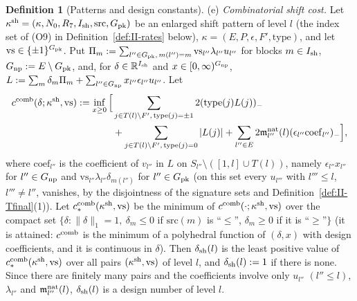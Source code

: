 \documentclass[10pt]{amsart}
\theoremstyle{definition}
\newtheorem{definition}[theorem]{Definition}
\theoremstyle{remark}
\newcommand{\R}{\mathbb R}
\begin{document}
\begin{definition}[Patterns and design constants]
\textup{(e)} \emph{Combinatorial shift cost.}  Let $\kappa^{\rm sh}=(\kappa,
N_0,R_7,I_{\rm sh},\mathrm{src},G_{\rm pk})$ be an enlarged shift pattern of
level $l$ (the index set of (O9) in Definition~\ref{def:II-rates} below),
$\kappa=(E,P,\epsilon,F',\mathrm{type})$, and let $\mathrm{vs}\in\{\pm1\}^{
G_{\rm pk}}$.  Put $\Pi_m:=\sum_{l''\in G_{\rm pk},\,m(l'')=m}\mathrm{vs}_{l''}
\lambda_{l''}u_{l''}$ for blocks $m\in I_{\rm sh}$, $G_{\rm np}:=E\setminus
G_{\rm pk}$, and, for $\delta\in\R^{I_{\rm sh}}$ and $x\in[0,\infty)^{G_{\rm
np}}$, $L:=\sum_m\delta_m\Pi_m+\sum_{l''\in G_{\rm np}}x_{l''}\epsilon_{l''}
u_{l''}$.  Let
\[
 \begin{split}
 c^{\rm comb}(\delta;\kappa^{\rm sh},\mathrm{vs}):=\inf_{x\ge0}\Big[&\sum_{j\in
 T(l)\setminus F',\,\mathrm{type}(j)=\pm1}2(\mathrm{type}(j)L(j))_-\\
 &+\sum_{j\in T(l)\setminus F',\,\mathrm{type}(j)=0}|L(j)|
 +\sum_{l''\in E}2\mathfrak m^{\rm nat}_{l''}(l)(\epsilon_{l''}
 \mathrm{coef}_{l''})_-\Big],
 \end{split}
\]
where $\mathrm{coef}_{l''}$ is the coefficient of $v_{l''}$ in $L$ on
$S_{l''}\setminus([1,l]\cup T(l))$, namely $\epsilon_{l''}x_{l''}$ for
$l''\in G_{\rm np}$ and $\mathrm{vs}_{l''}\lambda_{l''}\delta_{m(l'')}$ for
$l''\in G_{\rm pk}$ (on this set every $u_{l'''}$ with $l'''\le l$,
$l'''\ne l''$, vanishes, by the disjointness of the signature sets and
Definition~\ref{def:II-Tfinal}(1)).  Let $c^{\rm comb}_*(\kappa^{\rm sh},
\mathrm{vs})$ be the minimum of $c^{\rm comb}(\cdot;\kappa^{\rm sh},
\mathrm{vs})$ over the compact set $\{\delta:\|\delta\|_1=1,\ \delta_m\le0$
if $\mathrm{src}(m)$ is ``$\le$'', $\delta_m\ge0$ if it is ``$\ge$''$\}$
(it is attained: $c^{\rm comb}$ is the minimum of a polyhedral function of
$(\delta,x)$ with design coefficients, and it is continuous in $\delta$).
Then $\delta_{\rm sh}(l)$ is the least positive value of $c^{\rm comb}_*(
\kappa^{\rm sh},\mathrm{vs})$ over all pairs $(\kappa^{\rm sh},\mathrm{vs})$
of level $l$, and $\delta_{\rm sh}(l):=1$ if there is none.  Since there
are finitely many pairs and the coefficients involve only $u_{l''}$
$(l''\le l)$, $\lambda_{l''}$ and $\mathfrak m^{\rm nat}_{l''}(l)$,
$\delta_{\rm sh}(l)$ is a design number of level $l$.
\end{definition}
\end{document}
